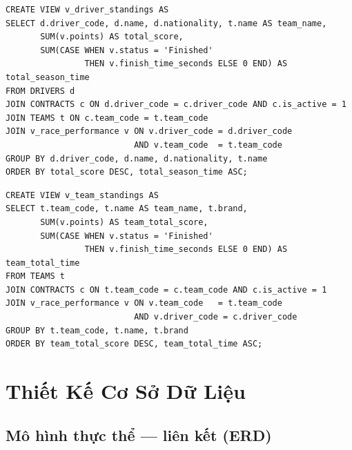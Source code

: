 \documentclass[13pt, a4paper]{report}
\begin{document}
\begin{lstlisting}[caption={View v\_driver\_standings --- BXH tay đua toàn mùa giải}]
CREATE VIEW v_driver_standings AS
SELECT d.driver_code, d.name, d.nationality, t.name AS team_name,
       SUM(v.points) AS total_score,
       SUM(CASE WHEN v.status = 'Finished' 
                THEN v.finish_time_seconds ELSE 0 END) AS total_season_time
FROM DRIVERS d
JOIN CONTRACTS c ON d.driver_code = c.driver_code AND c.is_active = 1
JOIN TEAMS t ON c.team_code = t.team_code
JOIN v_race_performance v ON v.driver_code = d.driver_code 
                          AND v.team_code  = t.team_code
GROUP BY d.driver_code, d.name, d.nationality, t.name
ORDER BY total_score DESC, total_season_time ASC;
\end{lstlisting}

\begin{lstlisting}[caption={View v\_team\_standings --- BXH đội đua toàn mùa giải}]
CREATE VIEW v_team_standings AS
SELECT t.team_code, t.name AS team_name, t.brand,
       SUM(v.points) AS team_total_score,
       SUM(CASE WHEN v.status = 'Finished' 
                THEN v.finish_time_seconds ELSE 0 END) AS team_total_time
FROM TEAMS t
JOIN CONTRACTS c ON t.team_code = c.team_code AND c.is_active = 1
JOIN v_race_performance v ON v.team_code   = t.team_code 
                          AND v.driver_code = c.driver_code
GROUP BY t.team_code, t.name, t.brand
ORDER BY team_total_score DESC, team_total_time ASC;
\end{lstlisting}

\chapter{Thiết Kế Cơ Sở Dữ Liệu}

\section{Mô hình thực thể --- liên kết (ERD)}
\end{document}
